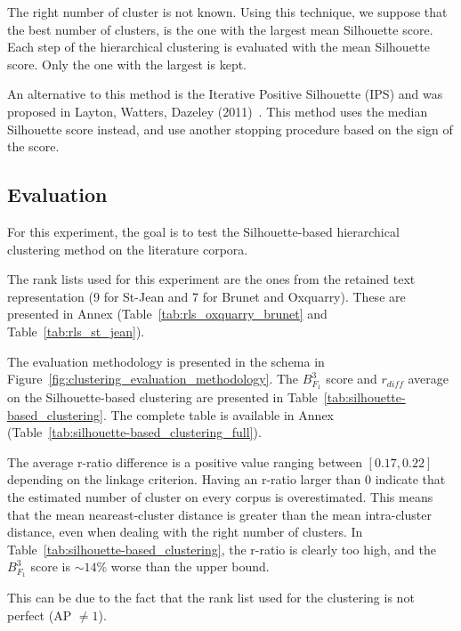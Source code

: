 The right number of cluster is not known.
Using this technique, we suppose that the best number of clusters, is the one with the largest mean Silhouette score.
Each step of the hierarchical clustering is evaluated with the mean Silhouette score.
Only the one with the largest is kept.

An alternative to this method is the Iterative Positive Silhouette (IPS) and was proposed in Layton, Watters, Dazeley (2011)~\cite{automated_unsupervised}.
This method uses the median Silhouette score instead, and use another stopping procedure based on the sign of the score.

\subsection{Evaluation}

For this experiment, the goal is to test the Silhouette-based hierarchical clustering method on the literature corpora.

The rank lists used for this experiment are the ones from the retained text representation (9 for St-Jean and 7 for Brunet and Oxquarry).
These are presented in Annex (Table~\ref{tab:rls_oxquarry_brunet} and Table~\ref{tab:rls_st_jean}).

The evaluation methodology is presented in the schema in Figure~\ref{fig:clustering_evaluation_methodology}.
The $B^3_{F_1}$ score and $r_{diff}$ average on the Silhouette-based clustering are presented in Table~\ref{tab:silhouette-based_clustering}.
The complete table is available in Annex (Table~\ref{tab:silhouette-based_clustering_full}).

The average r-ratio difference is a positive value ranging between $\left[0.17, 0.22\right]$ depending on the linkage criterion.
Having an r-ratio larger than $0$ indicate that the estimated number of cluster on every corpus is overestimated.
This means that the mean neareast-cluster distance is greater than the mean intra-cluster distance, even when dealing with the right number of clusters.
In Table~\ref{tab:silhouette-based_clustering}, the r-ratio is clearly too high, and the $B^3_{F_1}$ score is $\sim 14\%$ worse than the upper bound.

This can be due to the fact that the rank list used for the clustering is not perfect (AP $\neq 1$).

